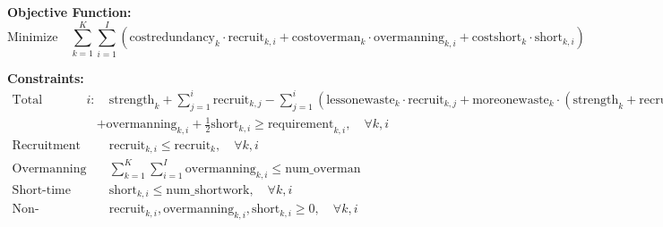 \documentclass{article}
\begin{document}
\textbf{Objective Function:}
\[
\text{Minimize} \quad \sum_{k=1}^{K} \sum_{i=1}^{I} \left( \text{costredundancy}_{k} \cdot \text{recruit}_{k,i} + \text{costoverman}_{k} \cdot \text{overmanning}_{k,i} + \text{costshort}_{k} \cdot \text{short}_{k,i} \right)
\]

\textbf{Constraints:}
\begin{align*}
\text{Total Manpower in Year } i: & \quad \text{strength}_{k} + \sum_{j=1}^{i} \text{recruit}_{k,j} - \sum_{j=1}^{i} \left( \text{lessonewaste}_{k} \cdot \text{recruit}_{k,j} + \text{moreonewaste}_{k} \cdot (\text{strength}_{k} + \text{recruit}_{k,j}) \right) \\
& + \text{overmanning}_{k,i} + \frac{1}{2} \text{short}_{k,i} \geq \text{requirement}_{k,i}, \quad \forall k, i \\
\text{Recruitment Limit:} & \quad \text{recruit}_{k,i} \leq \text{recruit}_{k}, \quad \forall k, i \\
\text{Overmanning Limit:} & \quad \sum_{k=1}^{K} \sum_{i=1}^{I} \text{overmanning}_{k,i} \leq \text{num\_overman} \\
\text{Short-time Working Limit:} & \quad \text{short}_{k,i} \leq \text{num\_shortwork}, \quad \forall k, i \\
\text{Non-negativity:} & \quad \text{recruit}_{k,i}, \text{overmanning}_{k,i}, \text{short}_{k,i} \geq 0, \quad \forall k, i
\end{align*}
\end{document}
